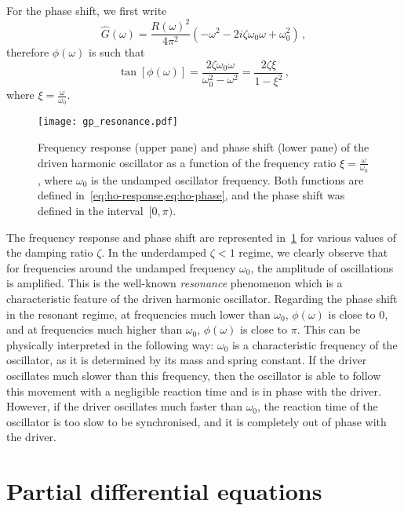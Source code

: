 For the phase shift, we first write
\begin{equation}
  \hat{G}(\omega)=\frac{R(\omega)^2}{4\pi^2}(-\omega^2-2i\zeta\omega_0\omega+\omega_0^2)\,,
\end{equation}
therefore $\phi(\omega)$ is such that
\begin{equation}
  \boxed{
    \tan[\phi(\omega)]=\frac{2\zeta\omega_0\omega}{\omega_0^2-\omega^2}
  =\frac{2\zeta\xi}{1-\xi^2}\,,}
  \label{eq:ho-phase}
\end{equation}
where $\xi=\frac{\omega}{\omega_0}$.
\begin{figure}[p]
  \centering
  \texttt{[image: gp\_resonance.pdf]}
  \caption{Frequency response (upper pane) and phase shift (lower pane) of the driven
    harmonic oscillator as a function of the frequency ratio $\xi=\frac{\omega}{\omega_0}$,
    where $\omega_0$ is the undamped oscillator frequency. Both functions are defined
    in~\cref{eq:ho-response,eq:ho-phase}, and the phase shift was defined in the
  interval~$[0,\pi)$.}
  \label{fig:resonance}
\end{figure}

The frequency response and phase shift are represented in~\cref{fig:resonance} for various
values of the damping ratio $\zeta$. In the underdamped $\zeta<1$ regime, we clearly
observe that for frequencies around the undamped frequency $\omega_0$, the amplitude of
oscillations is amplified. This is the well-known \emph{resonance} phenomenon which is a
characteristic feature of the driven harmonic oscillator. Regarding the phase shift in the
resonant regime, at frequencies much lower than $\omega_0$, $\phi(\omega)$ is close to
$0$, and at frequencies much higher than $\omega_0$, $\phi(\omega)$ is close to $\pi$.
This can be physically interpreted in the following way: $\omega_0$ is a characteristic
frequency of the oscillator, as it is determined by its mass and spring constant. If the
driver oscillates much slower than this frequency, then the oscillator is able to follow
this movement with a negligible reaction time and is in phase with the driver. However,
if the driver oscillates much faster than $\omega_0$, the reaction time of the oscillator
is too slow to be synchronised, and it is completely out of phase with the driver.
\section{Partial differential equations}
